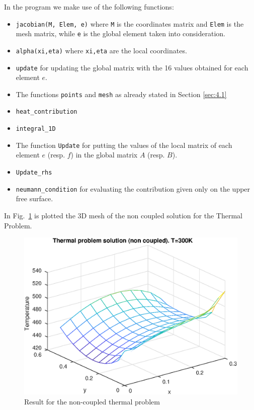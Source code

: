 In the program we make use of the following functions:
\begin{itemize}
	\item \texttt{jacobian(M, Elem, e)} where \texttt{M} is the coordinates matrix and \texttt{Elem} is the mesh matrix, while \texttt{e} is the global element taken into consideration.
	\item \texttt{alpha(xi,eta)} where \texttt{xi,eta} are the local coordinates.
	\item \texttt{update} for updating the global matrix with the 16 values obtained for each element $ e $. 
	\item The functions \texttt{points} and \texttt{mesh} as already stated in Section \ref{sec:4.1} 
	\item \texttt{heat\_contribution}
	\item \texttt{integral\_1D}
	\item The function \texttt{Update} for putting the values of the local matrix of each element $ e $ (resp. $ f $) in the global matrix $ A $ (resp. $ B $).
	\item \texttt{Update\_rhs}
	\item \texttt{neumann\_condition} for evaluating the contribution given only on the upper free surface.
\end{itemize}


In Fig.~\ref{fig:non-coupled_thermal_problem} is plotted the 3D mesh of the non coupled solution for the Thermal Problem. 
\begin{figure}[htbp]
	\centering
	\includegraphics{Matlab_Code/Temperature_result}
	\caption{Result for the non-coupled thermal problem}
	\label{fig:non-coupled_thermal_problem}
\end{figure}



